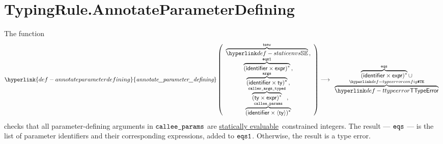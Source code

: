 \documentclass{book}
\newcommand\ProseOtherwiseTypeError[0]{Otherwise, the result is a type error.}
\newcommand\staticallyevaluable[0]{\hyperlink{def-staticallyevaluable}{statically evaluable}}
\newcommand\annotateparameterdefining[0]{\hyperlink{def-annotateparameterdefining}{\textfunc{annotate\_parameter\_defining}}}
\begin{document}
\section{TypingRule.AnnotateParameterDefining \label{sec:TypingRule.AnnotateParameterDefining}}
\hypertarget{def-annotateparameterdefining}{}
The function
\[
  \annotateparameterdefining
  \left(
    \begin{array}{c}
      \overname{\staticenvs}{\tenv} \aslsep\\
      \overname{(\identifier\times\expr)^*}{\eqsone} \aslsep\\
      \overname{(\identifier\times\ty)^*}{\vargs} \aslsep\\
      \overname{(\ty\times\expr)^*}{\callerargstyped} \aslsep\\
      \overname{(\identifier\times\langle\ty\rangle)^*}{\calleeparams}
    \end{array}
  \right)
  \aslto
  \begin{array}{c}
  \overname{(\identifier\times\expr)^*}{\eqs} \cup \\
  \overname{\TTypeError}{\TypeErrorConfig}
  \end{array}
\]
checks that all parameter-defining arguments
in $\texttt{callee\_params}$ are \staticallyevaluable\ constrained integers.
The result --- $\texttt{eqs}$ --- is the list of parameter identifiers and their corresponding expressions,
added to $\texttt{eqs1}$.
\ProseOtherwiseTypeError
\end{document}
